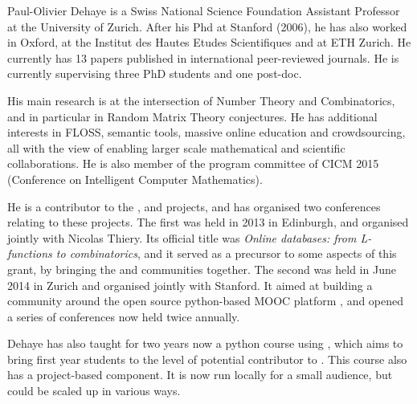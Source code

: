 \begin{participant}[type=leadPI,PM=6,gender=male]{Paul-Olivier Dehaye}
  is a Swiss National Science Foundation Assistant Professor at the
  University of Zurich. After his Phd at Stanford (2006), he has also worked in Oxford, at
  the Institut des Hautes Etudes Scientifiques and at ETH Zurich. He currently has 13
  papers published in international peer-reviewed journals. He is currently supervising
  three PhD students and one post-doc.

  His main research is at the intersection of Number Theory and Combinatorics, and in
  particular in Random Matrix Theory conjectures. He has additional interests in FLOSS,
  semantic tools, massive online education and crowdsourcing, all with the view of
  enabling larger scale mathematical and scientific collaborations. He is also member of
  the program committee of CICM 2015 (Conference on Intelligent Computer Mathematics).

  He is a contributor to the \Sage, \LMFDB and \OpenEdX projects, and has organised two
  conferences relating to these projects. The first was held in 2013 in Edinburgh, and
  organised jointly with Nicolas Thiery. Its official title was \emph{Online databases:
    from L-functions to combinatorics}, and it served as a precursor to some aspects of
  this grant, by bringing the \SageCombinat and \LMFDB communities together.  The second
  was held in June 2014 in Zurich and organised jointly with Stanford. It aimed at
  building a community around the open source python-based MOOC platform \OpenEdX, and
  opened a series of conferences now held twice annually.

  Dehaye has also taught for two years now a python course using \OpenEdX, which aims to
  bring first year students to the level of potential contributor to \Sage. This course
  also has a project-based component. It is now run locally for a small audience, but
  could be scaled up in various ways.
\end{participant}


